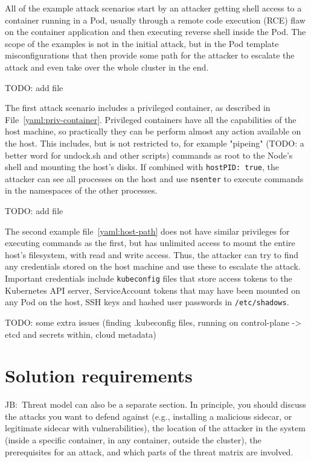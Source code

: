 \documentclass[english, 12pt, a4paper, sci, utf8, a-2b, online]{aaltothesis}
\newcommand{\mycomment}[3]{\textcolor{#1}{#2:~#3}}
\newcommand{\jb}[1]{\noindent\mycomment{aaltoRed}{JB}{#1}}
\begin{document}
All of the example attack scenarios start by an attacker getting shell access to a container running in a Pod, usually through a remote code execution (RCE) flaw on the container application and then executing reverse shell inside the Pod.
The scope of the examples is not in the initial attack, but in the Pod template misconfigurations that then provide some path for the attacker to escalate the attack and even take over the whole cluster in the end.

TODO: add file \label{yaml:priv-container}

The first attack scenario includes a privileged container, as described in File~\ref{yaml:priv-container}.
Privileged containers have all the capabilities of the host machine, so practically they can be perform almost any action available on the host.
This includes, but is not restricted to, for example "pipeing" (TODO: a better word for undock.sh and other scripts) commands as root to the Node's shell and mounting the host's disks.
If combined with \texttt{hostPID:\ true}, the attacker can see all processes on the host and use \texttt{nsenter} to execute commands in the namespaces of the other processes.

TODO: add file \label{yaml:host-path}

The second example file~\ref{yaml:host-path} does not have similar privileges for executing commands as the first, but has unlimited access to mount the entire host's filesystem, with read and write access.
Thus, the attacker can try to find any credentials stored on the host machine and use these to escalate the attack.
Important credentials include \texttt{kubeconfig} files that store access tokens to the Kubernetes API server, ServiceAccount tokens that may have been mounted on any Pod on the host, SSH keys and hashed user passwords in \texttt{/etc/shadows}.

TODO: some extra issues (finding .kubeconfig files, running on control-plane -> etcd and secrets within, cloud metadata)

\clearpage

\section{Solution requirements} \label{sec:methods}

\jb{Threat model can also be a separate section.
In principle, you should discuss the attacks you want to defend against (e.g., installing a malicious sidecar, or legitimate sidecar with vulnerabilities), the location of the attacker in the system (inside a specific container, in any container, outside the cluster),
the prerequisites for an attack, and which parts of the threat matrix are involved.}
\end{document}
